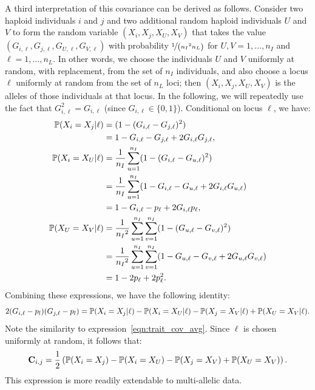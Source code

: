
A third interpretation of this covariance can be derived as follows.
%
Consider two haploid individuals $i$ and $j$ and
two additional random haploid individuals $U$ and $V$ to
form the random variable $(X_i, X_j, X_U, X_V)$
that takes the value $(G_{i,\ell}, G_{j,\ell}, G_{U,\ell}, G_{V,\ell})$
with probability $\nicefrac{1}{\left({n_I}^2 n_L\right)}$
for $U, V = 1, \dots, n_I$ and $\ell = 1, \dots, n_L$.
%
In other words, we choose the individuals $U$ and $V$ uniformly at
random, with replacement, from the set of $n_I$ individuals, and
also choose a locus $\ell$ uniformly at random from the set of $n_L$ loci;
then $(X_i, X_j, X_U, X_V)$ is the alleles of those individuals at that locus.
%
In the following, we will repeatedly use the fact that
$G^2_{i,\ell} = G_{i,\ell}$ (since $G_{i,\ell} \in \{0, 1\}$).
%
Conditional on locus $\ell$, we have:
%
\begin{align*}
    \P(X_i = X_j | \ell) &= (1 - (G_{i,\ell} - G_{j,\ell})^2) \\
                         &= 1 - G_{i,\ell} - G_{j,\ell} + 2G_{i,\ell}G_{j,\ell}, \\
    \P(X_i = X_U | \ell) &= \frac{1}{n_I}\sum_{u=1}^{n_I} (1 - (G_{i,\ell} - G_{u,\ell})^2) \\
                         &= \frac{1}{n_I}\sum_{u=1}^{n_I} (1 - G_{i,\ell} - G_{u,\ell} + 2G_{i,\ell}G_{u,\ell}) \\
                         &= 1 - G_{i,\ell} - p_\ell + 2G_{i,\ell}p_\ell, \\
    \P(X_U = X_V | \ell) &= \frac{1}{{n_I}^2}\sum_{u=1}^{n_I}\sum_{v=1}^{n_I} (1 - (G_{u,\ell} - G_{v,\ell})^2) \\
                         &= \frac{1}{{n_I}^2}\sum_{u=1}^{n_I}\sum_{v=1}^{n_I} (1 - G_{u,\ell} - G_{v,\ell} + 2G_{u,\ell}G_{v,\ell}) \\
                         &= 1 - 2p_\ell + 2p^2_\ell.
\end{align*}
%
Combining these expressions, we have the following identity:
%
\[ 2(G_{i,\ell} - p_l)(G_{j,\ell} - p_l) = \P(X_i = X_j | \ell) -
                                           \P(X_i = X_U | \ell) -
                                           \P(X_j = X_V | \ell) +
                                           \P(X_U = X_V | \ell) .\]
%
Note the similarity to expression~\eqref{eqn:trait_cov_avg}.
Since $\ell$ is chosen uniformly at random, it follows that:
%
\small{
\begin{align} \label{eqn:cov_prob}
    \mathbf{C}_{i,j} = \frac{1}{2}\left(\P(X_i = X_j) - \P(X_i = X_U) - \P(X_j = X_V) + \P(X_U = X_V) \right).
\end{align}
}
This expression is more readily extendable to multi-allelic data.

